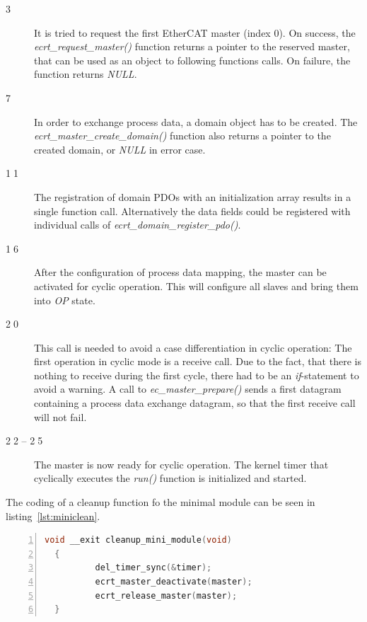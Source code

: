 \documentclass[a4paper,12pt,BCOR6mm,bibtotoc,idxtotoc]{scrbook}
\begin{document}
\begin{description}
\item[\normalfont\textcircled{\tiny 3}] It is tried to request the
  first EtherCAT master (index 0). On success, the
  \textit{ecrt\_\-request\_\-master()} function returns a pointer to
  the reserved master, that can be used as an object to following
  functions calls. On failure, the function returns \textit{NULL}.
\item[\normalfont\textcircled{\tiny 7}] In order to exchange process
  data, a domain object has to be created. The
  \textit{ecrt\_\-master\_\-create\_domain()} function also returns a
  pointer to the created domain, or \textit{NULL} in error case.
\item[\normalfont\textcircled{\tiny 11}] The registration of domain
  PDOs with an initialization array results in a single function call.
  Alternatively the data fields could be registered with individual
  calls of \textit{ecrt\_domain\_register\_pdo()}.
\item[\normalfont\textcircled{\tiny 16}] After the configuration of
  process data mapping, the master can be activated for cyclic
  operation. This will configure all slaves and bring them into
  \textit{OP} state.
\item[\normalfont\textcircled{\tiny 20}] This call is needed to avoid
  a case differentiation in cyclic operation: The first operation in
  cyclic mode is a receive call. Due to the fact, that there is
  nothing to receive during the first cycle, there had to be an
  \textit{if}-statement to avoid a warning. A call to
  \textit{ec\_master\_prepare()} sends a first datagram containing a
  process data exchange datagram, so that the first receive call will
  not fail.
\item[\normalfont\textcircled{\tiny 22} -- \textcircled{\tiny 25}] The
  master is now ready for cyclic operation. The kernel timer that
  cyclically executes the \textit{run()} function is initialized and
  started.
\end{description}

The coding of a cleanup function fo the minimal module can be seen in
listing~\ref{lst:miniclean}.

\begin{lstlisting}[language=C,numbers=left,caption={Minimal cleanup
    function},label={lst:miniclean}]
  void __exit cleanup_mini_module(void)
  {
          del_timer_sync(&timer);
          ecrt_master_deactivate(master);
          ecrt_release_master(master);
  }
\end{lstlisting}
\end{document}
